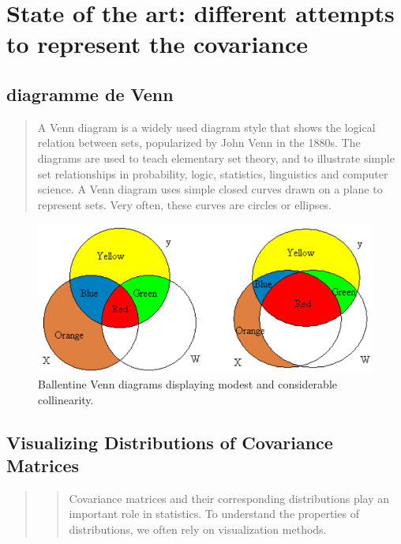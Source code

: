 \documentclass[
]{report}
\begin{document}
\hypertarget{state-of-the-art-different-attempts-to-represent-the-covariance}{%
\section{State of the art: different attempts to represent the covariance}\label{state-of-the-art-different-attempts-to-represent-the-covariance}}

\hypertarget{diagramme-de-venn}{%
\subsection{diagramme de Venn}\label{diagramme-de-venn}}

\begin{quote}
A Venn diagram is a widely used diagram style that shows the logical relation between sets, popularized by John Venn in the 1880s. The diagrams are used to teach elementary set theory, and to illustrate simple set relationships in probability, logic, statistics, linguistics and computer science. A Venn diagram uses simple closed curves drawn on a plane to represent sets. Very often, these curves are circles or ellipses.
\end{quote}

\begin{figure}
    \centering
    \includegraphics[width= 250 pt]{venn_colinearity.PNG}
    \caption{Ballentine Venn diagrams displaying modest and considerable collinearity.}
    \label{fig:my_label}
\end{figure}

\hypertarget{visualizing-distributions-of-covariance-matrices}{%
\subsection{Visualizing Distributions of Covariance Matrices}\label{visualizing-distributions-of-covariance-matrices}}

\begin{quote}
\begin{quote}
Covariance matrices and their corresponding distributions play an important role in statistics. To understand the properties of distributions, we often rely on visualization methods. \citep{VisCov}
\end{quote}
\end{quote}
\end{document}
